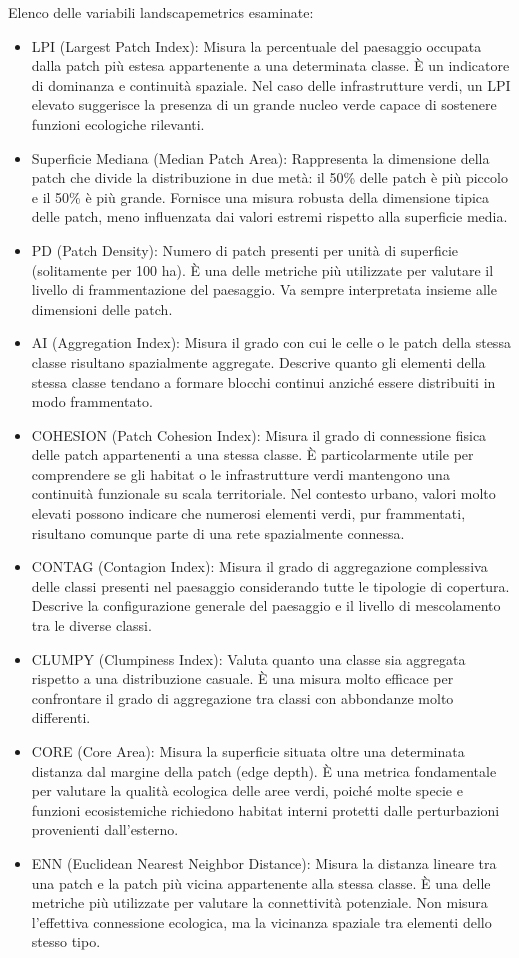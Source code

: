 \documentclass[
  a4paper,
]{book}
\providecommand{\tightlist}{%
  \setlength{\itemsep}{0pt}\setlength{\parskip}{0pt}}
\begin{document}
Elenco delle variabili landscapemetrics esaminate:

\begin{itemize}
\tightlist
\item
  LPI (Largest Patch Index): Misura la percentuale del paesaggio occupata dalla patch più estesa appartenente a una determinata classe. È un indicatore di dominanza e continuità spaziale. Nel caso delle infrastrutture verdi, un LPI elevato suggerisce la presenza di un grande nucleo verde capace di sostenere funzioni ecologiche rilevanti.
\item
  Superficie Mediana (Median Patch Area): Rappresenta la dimensione della patch che divide la distribuzione in due metà: il 50\% delle patch è più piccolo e il 50\% è più grande. Fornisce una misura robusta della dimensione tipica delle patch, meno influenzata dai valori estremi rispetto alla superficie media.
\item
  PD (Patch Density): Numero di patch presenti per unità di superficie (solitamente per 100 ha). È una delle metriche più utilizzate per valutare il livello di frammentazione del paesaggio. Va sempre interpretata insieme alle dimensioni delle patch.
\item
  AI (Aggregation Index): Misura il grado con cui le celle o le patch della stessa classe risultano spazialmente aggregate. Descrive quanto gli elementi della stessa classe tendano a formare blocchi continui anziché essere distribuiti in modo frammentato.
\item
  COHESION (Patch Cohesion Index): Misura il grado di connessione fisica delle patch appartenenti a una stessa classe. È particolarmente utile per comprendere se gli habitat o le infrastrutture verdi mantengono una continuità funzionale su scala territoriale. Nel contesto urbano, valori molto elevati possono indicare che numerosi elementi verdi, pur frammentati, risultano comunque parte di una rete spazialmente connessa.
\item
  CONTAG (Contagion Index): Misura il grado di aggregazione complessiva delle classi presenti nel paesaggio considerando tutte le tipologie di copertura. Descrive la configurazione generale del paesaggio e il livello di mescolamento tra le diverse classi.
\item
  CLUMPY (Clumpiness Index): Valuta quanto una classe sia aggregata rispetto a una distribuzione casuale. È una misura molto efficace per confrontare il grado di aggregazione tra classi con abbondanze molto differenti.
\item
  CORE (Core Area): Misura la superficie situata oltre una determinata distanza dal margine della patch (edge depth). È una metrica fondamentale per valutare la qualità ecologica delle aree verdi, poiché molte specie e funzioni ecosistemiche richiedono habitat interni protetti dalle perturbazioni provenienti dall'esterno.
\item
  ENN (Euclidean Nearest Neighbor Distance): Misura la distanza lineare tra una patch e la patch più vicina appartenente alla stessa classe. È una delle metriche più utilizzate per valutare la connettività potenziale. Non misura l'effettiva connessione ecologica, ma la vicinanza spaziale tra elementi dello stesso tipo.
\end{itemize}
\end{document}
